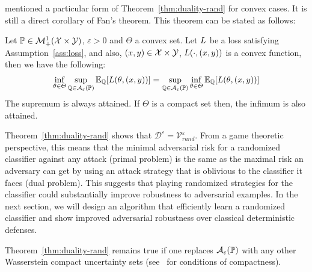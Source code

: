 \cite{bose2021adversarial} mentioned a particular form of Theorem~\ref{thm:duality-rand} for convex cases.  It is still a direct corollary of Fan's theorem. This theorem can be stated as follows: 
\begin{thm}Let $\mathbb{P}\in\mathcal{M}^1_+(\mathcal{X}\times\mathcal{Y})$, $\varepsilon>0$ and $\Theta$ a convex set. Let $L$ be a loss satisfying Assumption~\ref{ass:loss}, and also, $(x,y)\in\mathcal{X}\times\mathcal{Y}$, $L(\cdot,(x,y))$ is a convex function, then we have the following:
\begin{align*}
\inf_{\theta\in\Theta} \sup_{\QQ\in \mathcal{A}_{\varepsilon}(\PP)} \mathbb{E}_{ \QQ }\left[\loss(\theta,(x,y))\right]
=
\sup_{\QQ\in \mathcal{A}_{\varepsilon}(\PP)}\inf_{\theta\in \Theta}  \mathbb{E}_{\QQ }\left[\loss(\theta,(x,y))\right]
\end{align*}
The supremum is always attained. If $\Theta$ is a compact set then, the infimum is also attained.
\end{thm}


Theorem~\ref{thm:duality-rand} shows that $\mathcal{D}^\varepsilon=\mathcal{V}_{rand}^\varepsilon$. From a game theoretic perspective, this means that the minimal adversarial risk for a randomized classifier against any attack (primal problem) is the same as the maximal risk an adversary can get by using an attack strategy that is oblivious to the classifier it faces (dual problem). This suggests that playing randomized strategies for the classifier could substantially improve robustness to adversarial examples.
In the next section, we will design an algorithm that efficiently learn a randomized classifier and show improved adversarial robustness over classical deterministic defenses.


\begin{rmq}
Theorem~\ref{thm:duality-rand} remains true if one replaces $\mathcal{A}_\varepsilon(\mathbb{P})$ with any other Wasserstein compact uncertainty sets (see~\citep{yue2020linear} for conditions of compactness). 
\end{rmq}


